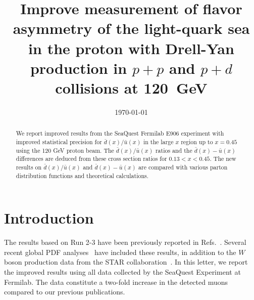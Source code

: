 \documentclass[reprint,aps,unsortedaddress,superscriptaddress,prl,floatfix,showpacs,linenumbers]{revtex4-2}
\begin{document}
\title{Improve measurement of flavor asymmetry of the light-quark sea in the proton with Drell-Yan production in
	\texorpdfstring{$p+p$}{p+p} and \texorpdfstring{$p+d$}{p+d} collisions at \texorpdfstring{\SI{120}{\GeV}}{120~GeV}}


\date{\today}

\begin{abstract}
	We report improved results from the SeaQuest Fermilab E906 experiment with improved statistical precision for
	$\bar{d}\left(x\right) / \bar{u}\left(x\right)$ in the large $x$ region up to $x=0.45$ using the 120 GeV proton beam.
	The $\bar{d}\left(x\right) / \bar{u}\left(x\right)$ ratios and the $\bar{d}\left(x\right) - \bar{u}\left(x\right)$
	differences are deduced from these cross section ratios for $0.13 < x < 0.45$.
	The new results on $\bar{d}\left(x\right) / \bar{u}\left(x\right)$ and $\bar{d}\left(x\right) - \bar{u}\left(x\right)$
	are compared with various parton distribution functions and theoretical calculations.
\end{abstract}


\maketitle

\section{Introduction}

The results based on Run 2-3 have been previously reported in Refs.~\cite{dove2021,dove2023}.
Several recent global PDF analyses~\cite{cocuzza2021,ball2022a,accardi2023,alekhin2023}
have included these results, in addition to the $W$ boson production data from the STAR collaboration~\cite{adam2021}.
In this letter, we report the improved results using all data collected by the SeaQuest Experiment at Fermilab.
The data constitute a two-fold increase in the detected muons compared to our previous publications.
\end{document}
